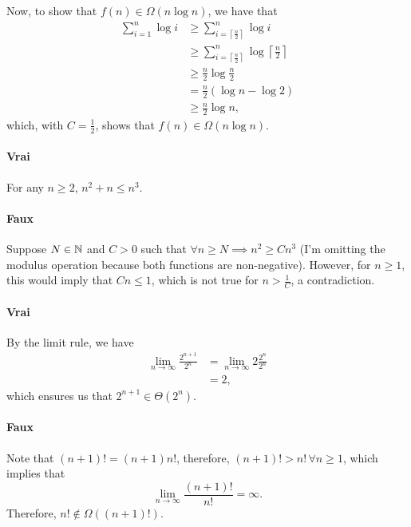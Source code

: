 Now, to show that $f(n) \in \Omega(n \log n)$, we have that
\begin{align*}
    \sum_{i=1}^{n} \log i &\ge \sum_{i=\left\lceil \frac{n}{2} \right\rceil }^{n} \log i \\
    &\ge \sum_{i=\left\lceil \frac{n}{2} \right\rceil }^{n} \log \left\lceil \frac{n}{2} \right\rceil  \\
    &\ge \frac{n}{2} \log \frac{n}{2} \\
    &= \frac{n}{2}\left( \log n - \log 2 \right) \\
    &\ge \frac{n}{2} \log n
,\end{align*}
which, with $C = \frac{1}{2}$, shows that $f(n) \in \Omega(n \log n)$.


\paragraph{Vrai}
For any $n\ge 2$, $n^2 + n \le n^3$.

\paragraph{Faux}
Suppose $N\in \mathbb{N}$ and $C>0$ such that $\forall n \ge N \implies n^2 \ge C n^3$ (I'm omitting the modulus operation because both functions are non-negative).
However, for $n\ge 1$, this would imply that $Cn \le 1$, which is not true for $n > \frac{1}{C}$, a contradiction.

\paragraph{Vrai}
By the limit rule, we have
\begin{align*}
    \lim_{n \to \infty} \frac{2^{n+1}}{2^{n}} &= \lim_{n \to \infty} 2 \frac{2^{n}}{2^{n}} \\
    &= 2
,\end{align*}
which ensures us that $2^{n+1} \in \Theta(2^{n})$.

\paragraph{Faux}
Note that $(n+1)!= (n+1) n!$, therefore, $(n+1)! > n! \,\forall n\ge 1 $, which implies that \[
\lim_{n \to \infty} \frac{(n+1)!}{n!} = \infty
.\] Therefore, $n! \not\in \Omega((n+1)!)$.

